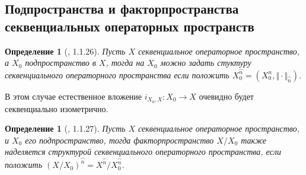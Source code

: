 \documentclass[12pt]{article}
\newtheorem{definition}[theorem]{Определение}
\begin{document}
\subsection{Подпространства и факторпространства секвенциальных операторных пространств}

\begin{definition}[\cite{LamOpFolgen}, 1.1.26]\label{DefSQSubSpace}
Пусть $X$ секвенциальное операторное пространство, а $X_0$ подпространство в $X$, тогда на $X_0$ можно задать стуктуру секвенциального операторного пространства если положить $X_0^{\wideparen{n}}=(X_0^n,\Vert\cdot\Vert_{\wideparen{n}})$.
\end{definition}

В этом случае естественное вложение $i_{X_0,X}:X_0\to X$ очевидно будет секвенциально изометрично.

\begin{definition}[\cite{LamOpFolgen}, 1.1.27]\label{DefSQFactorSpace}
Пусть $X$ секвенциальное операторное пространство, и $X_0$ его подпространство, тогда факторпространство $X / X_0$ также наделяется структурой секвенциального операторного пространства, если положить 
$(X / X_0)^{\wideparen{n}} = X^{\wideparen{n}} / X_0^{\wideparen{n}}$.
\end{definition}
\end{document}
